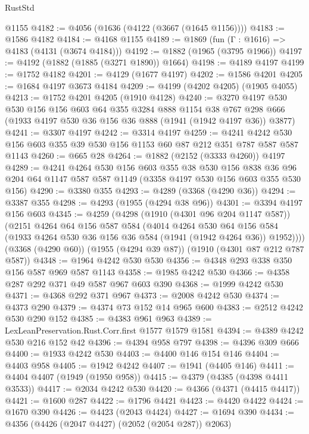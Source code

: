 \begin{lexlean}{RustStd}
\begin{coremodule}
    @1155
@4182 := @4056 (@1636 (@4122 (@3667 (@1645 @1156))))
@4183 := @1586 @4182
@4184 := @4168 @1155
@4189 := @1869 (fun (Γ : @1616) => @4183 (@4131 (@3674 @4184)))
@4192 := @1882 (@1965 (@3795 @1966))
@4197 := @4192 (@1882 (@1885 (@3271 @1890)) @1664)
@4198 := @4189 @4197
@4199 := @1752 @4182
@4201 := @4129 (@1677 @4197)
@4202 := @1586 @4201
@4205 := @1684 @4197 @3673 @4184
@4209 := @4199 (@4202 @4205) (@1905 @4055)
@4213 := @1752 @4201 @4205 (@1910 @4128)
@4240 := @3270
    @4197
    @530
    @530
    @156
    @156
    @603
    @64
    @355
    @3284
    @888
    @1154
    @38
    @767
    @298
    @666
    (@1933 @4197 @530 @36 @156 @36 @888 (@1941 (@1942 @4197 @36)) @3877)
@4241 := @3307 @4197
@4242 := @3314 @4197
@4259 := @4241 @4242 @530 @156 @603 @355 @39 @530 @156 @1153 @60 @87 @212 @351 @787 @587 @587 @1143
@4260 := @665 @28
@4264 := @1882 (@2152 (@3333 @4260)) @4197
@4289 := @4241
    @4264
    @530
    @156
    @603
    @355
    @38
    @530
    @156
    @838
    @36
    @96
    @204
    @64
    @1147
    @587
    @587
    @1149
    (@3358 @4197 @530 @156 @603 @355 @530 @156)
@4290 := @3380 @355
@4293 := @4289 (@3368 (@4290 @36))
@4294 := @3387 @355
@4298 := @4293 (@1955 (@4294 @38 @96))
@4301 := @3394 @4197 @156 @603
@4345 := @4259
    (@4298
      (@1910 (@4301 @96 @204 @1147 @587))
      (@2151
        @4264
        @64
        @156
        @587
        @584
        (@4014
          @4264
          @530
          @64
          @156
          @584
          (@1933 @4264 @530 @36 @156 @36 @584 (@1941 (@1942 @4264 @36)) @1952))))
    (@3368 (@4290 @60))
    (@1955 (@4294 @39 @87))
    (@1910 (@4301 @87 @212 @787 @587))
@4348 := @1964 @4242 @530 @530
@4356 := @4348 @293 @338 @350 @156 @587 @969 @587 @1143
@4358 := @1985 @4242 @530
@4366 := @4358 @287 @292 @371 @49 @587 @967 @603 @390
@4368 := @1999 @4242 @530
@4371 := @4368 @292 @371 @967
@4373 := @2008 @4242 @530
@4374 := @4373 @290
@4379 := @4374 @73 @152 @14 @965 @600
@4383 := @2512 @4242 @530 @290 @152
@4385 := @4383 @961 @963
@4389 := LexLeanPreservation.Rust.Corr.first @1577 @1579 @1581
@4394 := @4389 @4242 @530 @216 @152 @42
@4396 := @4394 @958 @797
@4398 := @4396 @309 @666
@4400 := @1933 @4242 @530
@4403 := @4400 @146 @154 @146
@4404 := @4403 @958
@4405 := @1942 @4242
@4407 := @1941 (@4405 @146)
@4411 := @4404 @4407 (@1949 (@1950 @958))
@4415 := @4379 (@4385 (@4398 @4411 @3533))
@4417 := @2034 @4242 @530
@4420 := @4366 (@4371 (@4415 @4417))
@4421 := @1600 @287
@4422 := @1796 @4421
@4423 := @4420 @4422
@4424 := @1670 @390
@4426 := @4423 (@2043 @4424)
@4427 := @1694 @390
@4434 := @4356 (@4426 (@2047 @4427) (@2052 (@2054 @287)) @2063)

\end{coremodule}
\end{lexlean}
